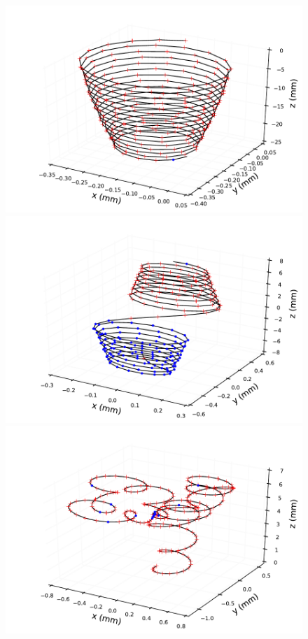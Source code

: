 \documentclass{JINST}
\begin{document}
\begin{figure}[!htb]
	\includegraphics[scale=0.48]{fig/plt_trkcurv_magse05_ms0_0.pdf}
	\includegraphics[scale=0.48]{fig/plt_trkcurv_magbb05_ms0_1.pdf}
	\includegraphics[scale=0.48]{fig/plt_trkcurv_magse05_ms13pt6_0.pdf}

\end{figure}
\end{document}
